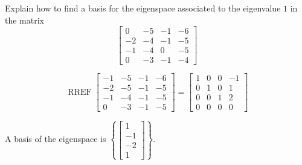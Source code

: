 
\begin{exerciseStatement}


Explain how to find a basis for the eigenspace associated to the eigenvalue \( 1 \) in the matrix \[ \left[\begin{array}{cccc}
0 & -5 & -1 & -6 \\
-2 & -4 & -1 & -5 \\
-1 & -4 & 0 & -5 \\
0 & -3 & -1 & -4
\end{array}\right] \]


\end{exerciseStatement}
    
\begin{exerciseAnswer} 


\[\operatorname{RREF} \left[\begin{array}{cccc}
-1 & -5 & -1 & -6 \\
-2 & -5 & -1 & -5 \\
-1 & -4 & -1 & -5 \\
0 & -3 & -1 & -5
\end{array}\right] = \left[\begin{array}{cccc}
1 & 0 & 0 & -1 \\
0 & 1 & 0 & 1 \\
0 & 0 & 1 & 2 \\
0 & 0 & 0 & 0
\end{array}\right] \]



A basis of the eigenspace is \( \left\{ \left[\begin{array}{c}
1 \\
-1 \\
-2 \\
1
\end{array}\right] \right\} \).


\end{exerciseAnswer}
    
